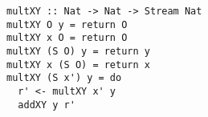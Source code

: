 \begin{figure}[!t]
  \centering
  \begin{minipage}{\columnwidth}
    \begin{lstlisting}[label={mult_fast}, caption={Efficient implementation of \lstinline{multo in in out} direciton}, captionpos=b, frame=tb]
multXY :: Nat -> Nat -> Stream Nat
multXY O y = return O
multXY x O = return O
multXY (S O) y = return y
multXY x (S O) = return x
multXY (S x') y = do
  r' <- multXY x' y
  addXY y r'
    \end{lstlisting}
  \end{minipage}
\end{figure}
